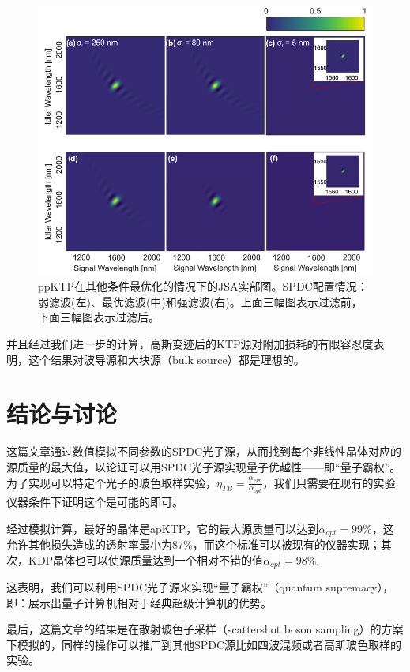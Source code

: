 \begin{figure}[ht]
	\centering
	\includegraphics[scale=0.4]{pic/result3}
	\caption{ppKTP在其他条件最优化的情况下的JSA实部图。SPDC配置情况：弱滤波(左)、最优滤波(中)和强滤波(右)。上面三幅图表示过滤前，下面三幅图表示过滤后。}
	\label{fig:result3}
\end{figure}


并且经过我们进一步的计算，高斯变迹后的KTP源对附加损耗的有限容忍度表明，这个结果对波导源和大块源（bulk source）都是理想的。

\section{结论与讨论}

这篇文章通过数值模拟不同参数的SPDC光子源，从而找到每个非线性晶体对应的源质量的最大值，以论证可以用SPDC光子源实现量子优越性——即“量子霸权”。为了实现可以特定个光子的玻色取样实验，$\eta_{TB}=\frac{\alpha_{spe}}{\alpha_{opt}}$，我们只需要在现有的实验仪器条件下证明这个是可能的即可。

经过模拟计算，最好的晶体是apKTP，它的最大源质量可以达到$\alpha_{opt}=99\%$，这允许其他损失造成的透射率最小为$87\%$，而这个标准可以被现有的仪器实现；其次，KDP晶体也可以使源质量达到一个相对不错的值$\alpha_{opt}=98\%$. 

这表明，我们可以利用SPDC光子源来实现“量子霸权”（quantum supremacy），即：展示出量子计算机相对于经典超级计算机的优势。

最后，这篇文章的结果是在散射玻色子采样（scattershot boson sampling）的方案下模拟的，同样的操作可以推广到其他SPDC源比如四波混频或者高斯玻色取样的实验。

